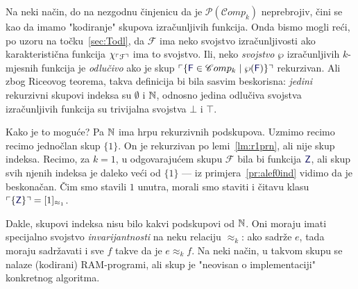 Na neki način, do na nezgodnu činjenicu da je $\mathcal P(\mathscr Comp_k)$ neprebrojiv, čini se kao da imamo "kodiranje" skupova izračunljivih funkcija. Onda bismo mogli reći, po uzoru na točku~\ref{sec:Todl}, da $\mathcal F$ ima neko svojstvo izračunljivosti ako karakteristična funkcija $\chi_{\ulcorner\mathcal F\urcorner}$ ima to svojstvo. Ili, neko \emph{svojstvo} $\wp$ izračunljivih $k$-mjesnih funkcija je \emph{odlučivo} ako je skup $\kins{\{\f F\in\mathscr Comp_k\mid\wp(\f F)\}}$ rekurzivan. Ali zbog Riceovog teorema, takva definicija bi bila sasvim beskorisna: \emph{jedini} rekurzivni skupovi indeksa su $\emptyset$ i ${\mathbb N}$, odnosno jedina odlučiva svojstva izračunljivih funkcija su trivijalna svojstva $\bot$ i $\top$.


Kako je to moguće? Pa ${\mathbb N}$ ima hrpu rekurzivnih podskupova. Uzmimo recimo %
%
recimo jednočlan skup $\{1\}$. On je rekurzivan po lemi~\ref{lm:r1prn}, ali nije skup indeksa. Recimo, za $k=1$, u odgovarajućem skupu $\mathcal F$ bila bi funkcija $\f Z$, ali skup svih njenih indeksa je daleko veći od $\{1\}$ --- iz primjera~\ref{pr:alef0ind} vidimo da je beskonačan. Čim smo stavili $1$ unutra, morali smo staviti i čitavu klasu $\kins{\{\f Z\}}=[1]_{\approx_1}$.

Dakle, skupovi indeksa nisu bilo kakvi podskupovi od ${\mathbb N}$. Oni moraju imati specijalno svojstvo \emph{invarijantnosti} na neku relaciju $\approx_k$: ako sadrže $e$, tada moraju sadržavati i sve $f$ takve da je $e\approx_k f$. Na neki način, u takvom skupu se nalaze (kodirani) RAM-programi, ali skup je "neovisan o implementaciji" konkretnog algoritma. 


